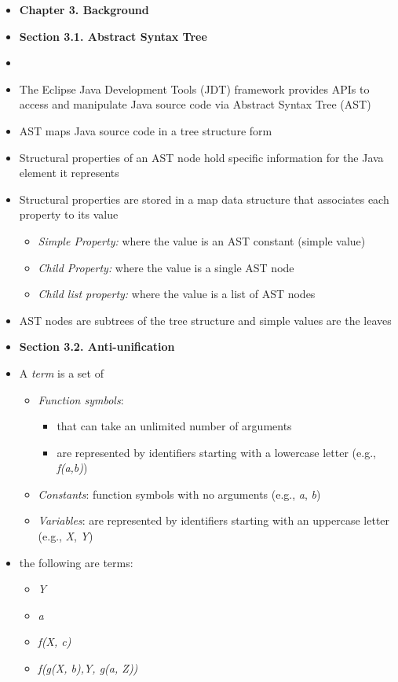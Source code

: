 \documentclass{article}
\newcommand{\bold}{\textbf}
\newcommand{\itt}{\textit}
\newcommand{\vars}{\textit}
\begin{document}
\begin{itemize} [leftmargin=.1in]
\item \bold{Chapter 3. Background}
\item \bold{Section 3.1. Abstract Syntax Tree}


\item {}
\item The Eclipse Java Development Tools (JDT) framework provides APIs to access and manipulate Java source code via Abstract Syntax Tree (AST)
\item AST maps Java source code in a tree structure form
\item Structural properties of an AST node hold specific information for the Java element it represents
\item Structural properties are stored in a map data structure that associates each property to its value
\begin{itemize} [leftmargin=.1in]
\item \itt{Simple Property:} where the value is an AST constant (simple value)
\item \itt{Child Property:} where the value is a single AST node
\item \itt{Child list property:} where the value is a list of AST nodes
\end{itemize}
\item AST nodes are subtrees of the tree structure and simple values are the leaves

\item \bold{Section 3.2. Anti-unification}
\item  A \itt{term} is a set of
\begin{itemize} [leftmargin=.1in]
\item \itt{Function symbols}:
\begin{itemize} [leftmargin=.1in]
\item that can take an unlimited number of arguments
\item are represented by identifiers starting with a lowercase letter (e.g., \vars{f(a,b)})
\end{itemize}
\item \itt{Constants}: function symbols with no arguments (e.g., \vars{a}, \vars{b})
\item \itt{Variables}: are represented by identifiers starting with an uppercase letter (e.g., \vars{X}, \vars{Y})
\end{itemize}
\item the following are terms:
\begin{itemize}
\item \vars{Y}
\item \vars{a}
\item \vars{f(X, c)}
\item \vars{f(g(X, b),Y, g(a, Z))}
\end{itemize}


\end{itemize}
\end{document}
